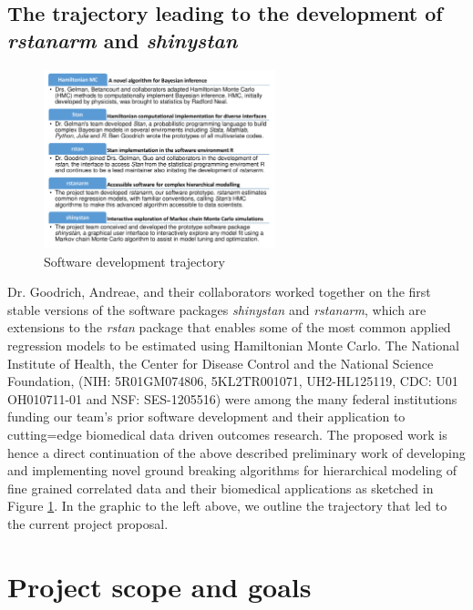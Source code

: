 \documentclass[11pt,notitlepage]{article}
\begin{document}
\subsection*{The trajectory leading to the development of \textit{rstanarm} and \textit{shinystan}} 

\begin{figure} 
 \vspace{- 15pt}
    \centering
\includegraphics[width=0.6\textwidth]{Figures/SoftwareTrajectory.pdf}
  \vspace{-32pt}
  \caption{Software development trajectory}
    \label{fig:trajectory}
 \vspace{- 15pt}
\end{figure}

Dr. Goodrich, Andreae, and their collaborators worked together on the first stable versions of the software packages 
\textit{shinystan} and \textit{rstanarm}, which are extensions to the \textit{rstan} package 
that enables some of the most common applied regression models to be estimated using Hamiltonian Monte Carlo. 
The National Institute of Health, the Center for Disease Control and the National Science Foundation, 
(NIH: 5R01GM074806, 5KL2TR001071, UH2-HL125119,  CDC: U01 OH010711-01 and NSF: SES-1205516) were among the many 
federal institutions funding our team's prior software \cite{Stan-manual:2015} development and their application 
to cutting=edge biomedical data driven outcomes research. The proposed work is hence a direct continuation of the 
above described preliminary work of developing and implementing novel ground breaking algorithms for hierarchical 
modeling of fine grained correlated data and their biomedical applications as sketched in Figure \ref{fig:trajectory}. In the graphic to the left above, we 
outline the trajectory that led to the current project proposal.

\section*{Project scope and goals }
\end{document}
